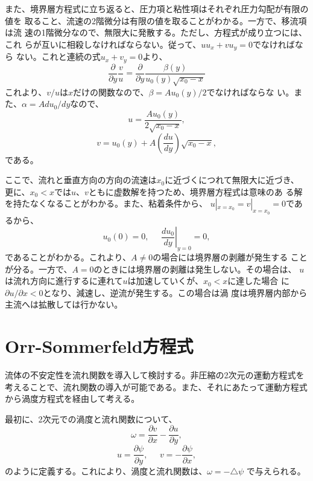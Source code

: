 また、境界層方程式に立ち返ると、圧力項と粘性項はそれぞれ圧力勾配が有限の値を
取ること、流速の2階微分は有限の値を取ることがわかる。一方で、移流項は流
速の1階微分なので、無限大に発散する。ただし、方程式が成り立つには、これ
らが互いに相殺しなければならない。従って、$uu_x + vu_y=0$でなければなら
ない。これと連続の式$u_x+v_y=0$より、
\begin{equation}
 \frac{\partial}{\partial y}\frac{v}{u}=
  \frac{\partial}{\partial y}\frac{\beta(y)}{u_0(y)\sqrt{x_0-x}}
\end{equation}
これより、$v/u$は$x$だけの関数なので、$\beta=Au_0(y)/2$でなければならな
い。また、$\alpha=Adu_0/dy$なので、
\begin{equation}
 u = \frac{Au_0(y)}{2\sqrt{x_0-x}},
\end{equation}
\begin{equation}
 v = u_0(y)+A\left(\frac{du}{dy}\right)\sqrt{x_0-x},
\end{equation}
 である。

ここで、流れと垂直方向の方向の流速は$x_0$に近づくにつれて無限大に近づき、
更に、$x_0<x$では$u$、$v$ともに虚数解を持つため、境界層方程式は意味のあ
る解を持たなくなることがわかる。また、粘着条件から、
$u|_{x=x_0}=v|_{x=x_0}=0$であるから、
\begin{equation}
 u_0(0) = 0, \mspace{25mu} \left.\frac{du_0}{dy}\right|_{y=0} = 0,
\end{equation}
であることがわかる。これより、$A\neq 0$の場合には境界層の剥離が発生する
ことが分る。一方で、$A=0$のときには境界層の剥離は発生しない。その場合は、
$u$は流れ方向に進行するに連れて$u$は加速していくが、$x_0<x$に達した場合
に$\partial u/\partial x<0$となり、減速し、逆流が発生する。この場合は渦
度は境界層内部から主流へは拡散しては行かない。

\section{Orr-Sommerfeld方程式}
流体の不安定性を流れ関数を導入して検討する。非圧縮の2次元の運動方程式を
考えることで、流れ関数の導入が可能である。また、それにあたって運動方程式
から渦度方程式を経由して考える。

最初に、2次元での渦度と流れ関数について、
\begin{equation}
 \omega = \frac{\partial v}{\partial x} 
  - \frac{\partial u}{\partial y},
\end{equation}
\begin{equation}
 u = \frac{\partial \psi}{\partial y}, \mspace{25mu}
  v = -\frac{\partial \psi}{\partial x},
\end{equation}
のように定義する。これにより、渦度と流れ関数は、$\omega=-\triangle\psi$
で与えられる。

